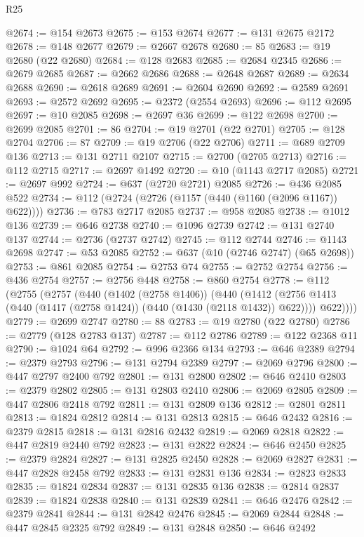 \begin{lexlean}{R25}
\begin{coremodule}
{{{{{{{{{{{{{{{{{{{{{{{{{{{{{{{{{{{{{{{{{{{{{{{{{{{{{{{{{{{{{{{{{{{{{{{{{{{{{{{{{{{{{{{{{{{{{{{{{{{{{{{{{{{{{{{{{{{{{{{{{{{{{{{{{{{{{{{{{{{{{{{{{{{{{{{{{{{{{{{{{{{{{{{{{{{{{{{{{{{{{{{{{{{{{{{{{{{{{{{@2674 := @154 @2673
@2675 := @153 @2674
@2677 := @131 @2675 @2172
@2678 := @148 @2677
@2679 := @2667 @2678
@2680 := 85
@2683 := @19 @2680 (@22 @2680)
@2684 := @128 @2683
@2685 := @2684 @2345
@2686 := @2679 @2685
@2687 := @2662 @2686
@2688 := @2648 @2687
@2689 := @2634 @2688
@2690 := @2618 @2689
@2691 := @2604 @2690
@2692 := @2589 @2691
@2693 := @2572 @2692
@2695 := @2372 (@2554 @2693)
@2696 := @112 @2695
@2697 := @10 @2085
@2698 := @2697 @36
@2699 := @122 @2698
@2700 := @2699 @2085
@2701 := 86
@2704 := @19 @2701 (@22 @2701)
@2705 := @128 @2704
@2706 := 87
@2709 := @19 @2706 (@22 @2706)
@2711 := @689 @2709 @136
@2713 := @131 @2711 @2107
@2715 := @2700 (@2705 @2713)
@2716 := @112 @2715
@2717 := @2697 @1492
@2720 := @10 (@1143 @2717 @2085)
@2721 := @2697 @992
@2724 := @637 (@2720 @2721) @2085
@2726 := @436 @2085 @522
@2734 := @112 (@2724 (@2726 (@1157 (@440 (@1160 (@2096 @1167)) @622))))
@2736 := @783 @2717 @2085
@2737 := @958 @2085
@2738 := @1012 @136
@2739 := @646 @2738
@2740 := @1096 @2739
@2742 := @131 @2740 @137
@2744 := @2736 (@2737 @2742)
@2745 := @112 @2744
@2746 := @1143 @2698
@2747 := @53 @2085
@2752 := @637 (@10 (@2746 @2747) (@65 @2698))
@2753 := @861 @2085
@2754 := @2753 @74
@2755 := @2752 @2754
@2756 := @436 @2754
@2757 := @2756 @448
@2758 := @860 @2754
@2778 := @112
    (@2755
      (@2757
        (@440
          (@1402 (@2758 @1406))
          (@440
            (@1412 (@2756 @1413 (@440 (@1417 (@2758 @1424)) (@440 (@1430 (@2118 @1432)) @622))))
            @622))))
@2779 := @2699 @2747
@2780 := 88
@2783 := @19 @2780 (@22 @2780)
@2786 := @2779 (@128 @2783 @137)
@2787 := @112 @2786
@2789 := @122 @2368 @11
@2790 := @1024 @64
@2792 := @996 @2366 @134
@2793 := @646 @2389
@2794 := @2379 @2793
@2796 := @131 @2794 @2389
@2797 := @2069 @2796
@2800 := @447 @2797 @2400 @792
@2801 := @131 @2800
@2802 := @646 @2410
@2803 := @2379 @2802
@2805 := @131 @2803 @2410
@2806 := @2069 @2805
@2809 := @447 @2806 @2418 @792
@2811 := @131 @2809 @136
@2812 := @2801 @2811
@2813 := @1824 @2812
@2814 := @131 @2813
@2815 := @646 @2432
@2816 := @2379 @2815
@2818 := @131 @2816 @2432
@2819 := @2069 @2818
@2822 := @447 @2819 @2440 @792
@2823 := @131 @2822
@2824 := @646 @2450
@2825 := @2379 @2824
@2827 := @131 @2825 @2450
@2828 := @2069 @2827
@2831 := @447 @2828 @2458 @792
@2833 := @131 @2831 @136
@2834 := @2823 @2833
@2835 := @1824 @2834
@2837 := @131 @2835 @136
@2838 := @2814 @2837
@2839 := @1824 @2838
@2840 := @131 @2839
@2841 := @646 @2476
@2842 := @2379 @2841
@2844 := @131 @2842 @2476
@2845 := @2069 @2844
@2848 := @447 @2845 @2325 @792
@2849 := @131 @2848
@2850 := @646 @2492
}}}}}}}}}}}}}}}}}}}}}}}}}}}}}}}}}}}}}}}}}}}}}}}}}}}}}}}}}}}}}}}}}}}}}}}}}}}}}}}}}}}}}}}}}}}}}}}}}}}}}}}}}}}}}}}}}}}}}}}}}}}}}}}}}}}}}}}}}}}}}}}}}}}}}}}}}}}}}}}}}}}}}}}}}}}}}}}}}}}}}}}}}}}}}}}}}}}}}}}
\end{coremodule}
\end{lexlean}
